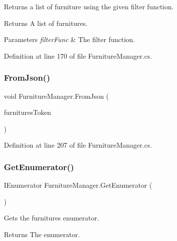 Returns a list of furniture using the given filter function. 

\begin{DoxyReturn}{Returns}
A list of furnitures.
\end{DoxyReturn}

\begin{DoxyParams}{Parameters}
{\em filter\+Func} & The filter function.\\
\hline
\end{DoxyParams}


Definition at line 170 of file Furniture\+Manager.\+cs.

\mbox{\label{class_furniture_manager_a3e1027bf9740154600e18d726e73e2fd}} 
\subsubsection{\texorpdfstring{From\+Json()}{FromJson()}}
{\footnotesize\ttfamily void Furniture\+Manager.\+From\+Json (\begin{DoxyParamCaption}\item[{J\+Token}]{furnitures\+Token }\end{DoxyParamCaption})}



Definition at line 207 of file Furniture\+Manager.\+cs.

\mbox{\label{class_furniture_manager_ae0592610047ec63534e486aea0efe024}} 
\subsubsection{\texorpdfstring{Get\+Enumerator()}{GetEnumerator()}}
{\footnotesize\ttfamily I\+Enumerator Furniture\+Manager.\+Get\+Enumerator (\begin{DoxyParamCaption}{ }\end{DoxyParamCaption})}



Gets the furnitures enumerator. 

\begin{DoxyReturn}{Returns}
The enumerator.
\end{DoxyReturn}


